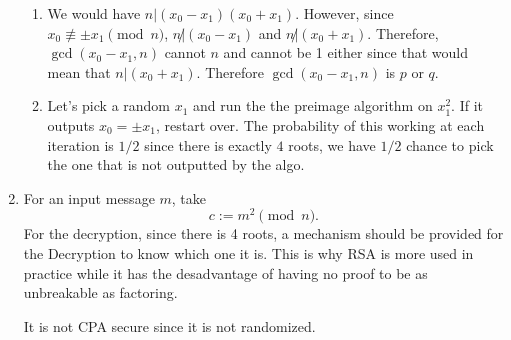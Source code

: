 \begin{solution}
\begin{enumerate}
\begin{enumerate}
        \item
          We would have $n | (x_0-x_1)(x_0+x_1)$.
          However, since $x_0 \not\equiv \pm x_1 \pmod{n}$,
          $n \not| (x_0-x_1)$ and $n \not| (x_0 + x_1)$.
          Therefore, $\gcd(x_0-x_1,n)$ cannot $n$ and cannot be 1 either
          since that would mean that $n | (x_0 + x_1)$.
          Therefore $\gcd(x_0-x_1,n)$ is $p$ or $q$.
        \item
          Let's pick a random $x_1$ and run the the preimage algorithm on $x_1^2$.
          If it outputs $x_0 = \pm x_1$, restart over.
          The probability of this working at each iteration is $1/2$ since there is exactly $4$ roots,
          we have $1/2$ chance to pick the one that is not outputted by the algo.
      \end{enumerate}
    \item
      For an input message $m$, take
      \[ c := m^2 \pmod{n}. \]
      For the decryption, since there is 4 roots, a mechanism should be provided for the Decryption to know which one it is.
      This is why RSA is more used in practice while it has the desadvantage of having no proof to be as unbreakable as factoring.

      It is not CPA secure since it is not randomized.
  \end{enumerate}
\end{solution}

